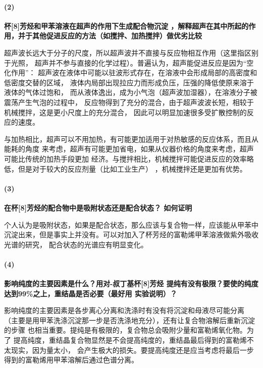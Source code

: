 \documentclass[a4paper,zihao=5,UTF8]{ctexart}
\begin{document}
    \paragraph{(2)}\textbf{杯[8]芳烃和甲苯溶液在超声的作用下生成配合物沉淀
    ，解释超声在其中所起的作用，并于其他促进反应的方法（如搅拌、加热搅拌）做优劣比较}
    \par 
    超声波长远大于分子的尺度，所以超声波并不直接与反应物相互作用（这里指区别于光照，
    超声并不参与直接的化学过程）。普遍认为，超声能促进反应是因为“空化作用”：
    超声波在液体中可能以驻波形式存在，在溶液中会形成局部的高密度和低密度交替的区域，
    液体内局部出现拉应力而形成负压，压强的降低使原来溶于液体的气体过饱和，
    而从液体逸出，成为小气泡（超声波加湿器），在溶液分子被震荡产生气泡的过程中，
    反应物得到了充分的混合，由于超声波波长短，相较于机械搅拌，这是更小尺度上的充分混合，
    因此可以明显加速很多受扩散控制的反应的速度。
    \par 
    与加热相比，超声可以不用加热，有可能更加适用于对热敏感的反应体系，而且从能耗的角度
    来考虑，超声有可能更加省电，如果从仪器价格的角度来考虑，超声可能比传统的加热手段更加
    经济。与搅拌相比，机械搅拌可能促进反应的效率略低，但是对于较大的反应剂量（比如工业生产）
    ，机械搅拌还是更加有优势。
    \paragraph{(3)}\textbf{在杯[8]芳烃的配合物中是吸附状态还是配合状态？
    如何证明}
    \par 
    个人认为是吸附状态，如果是配合状态，那么应该与复合物一样，应该能从甲苯中
    沉淀出来，但是事实上并没有。可以对加入了杯芳烃的富勒烯甲苯溶液做紫外吸收光谱的研究，
    配合状态的光谱应有明显变化。
    \paragraph{(4)}\textbf{影响纯度的主要因素是什么？用对-叔丁基杯[8]芳烃
    提纯有没有极限？要使的纯度达到99\%之上，重结晶是否必要（最好用
    实验说明）？}
    \par 
    影响纯度的主要因素是各步离心分离和洗涤时有没有将沉淀和母液尽可能分离
    （主要是用甲苯洗涤沉淀那一步是否洗涤地充分），还有让复合物溶解后重新沉淀的步骤
    也相当重要。提纯是有极限的，复合物总会吸附少量和富勒烯氧化物。为了
    提高纯度，重结晶复合物显然是不会提高纯度的，重结晶最后得到的富勒烯不太现实，因为量太小，
    会产生极大的损失。要提高纯度还是应当考虑将最后一步得到的富勒烯用甲苯溶解后通过色谱分离。
\end{document}
